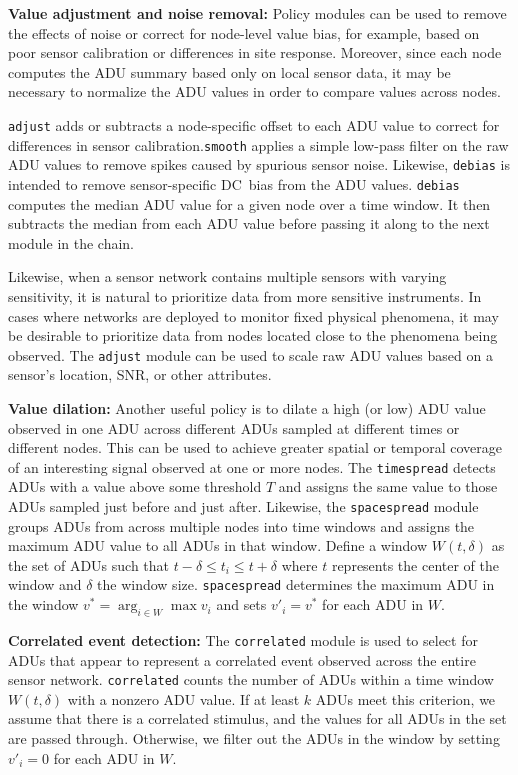 \documentclass[lettersize]{sig-alternate-konrad}
\begin{document}
{\bf Value adjustment and noise removal:} 
Policy modules can be used to remove the effects of noise or correct 
for node-level value bias, for example, based on poor sensor 
calibration or differences in site response. Moreover, since each node 
computes the ADU summary based only on local sensor data, it may be 
necessary to normalize the ADU values in order to compare 
values across nodes. 

{\tt adjust} adds or subtracts a node-specific offset to each ADU
value to correct for differences in sensor calibration.{\tt smooth}
applies a simple low-pass filter on the raw ADU values to remove
spikes caused by spurious sensor noise.
Likewise, {\tt debias} is intended to remove
sensor-specific DC~bias from the ADU values.
{\tt debias} computes the median ADU value for a given node over 
a time window. It then subtracts the median from each ADU value before 
passing it along to the next module in the chain. 

Likewise, when a sensor network contains
multiple sensors with varying sensitivity, it is natural to
prioritize data from more sensitive instruments. In cases where networks are
deployed to monitor fixed physical phenomena, it may be desirable to
prioritize data from nodes located close to the phenomena being
observed. The {\tt adjust} module can be used to scale
raw ADU values based on a sensor's location, SNR, or other attributes.

{\bf Value dilation:} 
Another useful policy is to dilate a high (or
low) ADU value observed in one ADU across different ADUs sampled
at different times or different nodes. This can be used to achieve
greater spatial or temporal coverage of an interesting signal
observed at one or more nodes. The {\tt timespread} detects ADUs with
a value above some threshold $T$ and 
assigns the same value to those ADUs sampled just before and just
after.
Likewise, the {\tt spacespread} module groups ADUs from across multiple
nodes into time windows and assigns the maximum ADU value to all
ADUs in that window.  Define a window $W(t,\delta)$ as the set of ADUs
such that $t-\delta \leq t_i \leq t+\delta$ where $t$ represents the
center of the window and $\delta$ the window size. {\tt spacespread}
determines the maximum ADU in the window $v^* = \arg_{i \in W} \max v_i$
and sets $v'_i = v^{*}$ for each ADU in $W$. 

{\bf Correlated event detection:}
The {\tt correlated} module is used to 
select for ADUs that appear to represent a correlated
event observed across the entire sensor network. 
{\tt correlated} counts the number of ADUs within a time window
$W(t,\delta)$ with a nonzero ADU value.
If at least $k$ ADUs meet this criterion, we assume that there is 
a correlated stimulus, and the values for all ADUs in 
the set are passed through.  Otherwise, we filter out the ADUs in 
the window by setting $v'_i = 0$ for each ADU in $W$.
\end{document}
